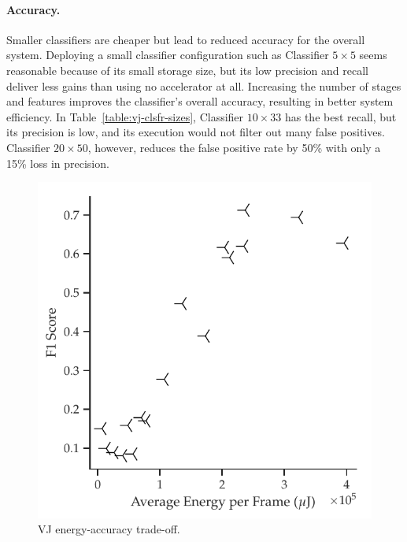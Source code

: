 \paragraph{Accuracy.}
Smaller classifiers are cheaper but lead to reduced accuracy
for the overall system.
Deploying a small classifier configuration such as Classifier $5\times 5$ seems reasonable
because of its small storage size, but its low
precision and recall deliver less gains than using no accelerator at all. Increasing
the number of stages and features improves the classifier's overall accuracy, resulting
in better system efficiency. In Table~\ref{table:vj-clsfr-sizes},
Classifier $10\times 33$ has the best recall, but its precision
is low, and its execution would not filter out many false positives. Classifier
$20\times 50$, however, reduces the false positive rate by 50\% with only a 15\% loss in precision.

\begin{figure}
\includegraphics[width=\textwidth]{nsp-figs/eval_vj_energ_acc2.pdf}
    \caption{VJ energy-accuracy trade-off.}
    \label{fig:vj-tradeoff}
\end{figure}

